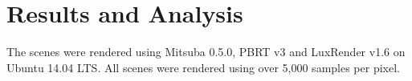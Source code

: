 \section{Results and Analysis}

% 

The scenes were rendered using Mitsuba 0.5.0, PBRT v3 and LuxRender v1.6 on 
Ubuntu 14.04 LTS. All scenes were rendered using over 5,000 samples per pixel. 


